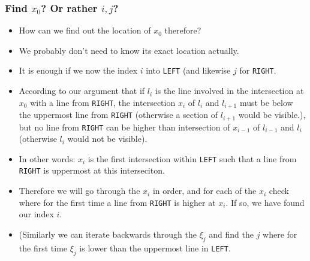 \documentclass[ignorenonframetext,]{beamer}
\begin{document}
\begin{frame}
  \frametitle{Find $x_0$? Or rather $i,j$?}
  \begin{itemize}
  \item How can we find out the location of $x_0$ therefore? 
  \item We probably don't need to know its exact location actually. 
  \item It is enough if we now the index $i$ into \texttt{LEFT} (and likewise $j$
    for \texttt{RIGHT}.
  \item According to our argument that if $l_i$ is the line involved
    in the intersection at $x_0$ with a line from \texttt{RIGHT}, the
    intersection $x_i$ of $l_i$ and $l_{i+1}$ must be below the
    uppermost line from \texttt{RIGHT} (otherwise a section of
    $l_{i+1}$ would be visible.), but no line from \texttt{RIGHT} can
    be higher than intersection of $x_{i-1}$  of $l_{i-1}$ and $l_i$
    (otherwise $l_i$ would not be visible).
  \item In other words: $x_i$ is the first intersection within
    \texttt{LEFT} such that a line from \texttt{RIGHT} is uppermost at
    this interseciton.
  \item Therefore we will go through the $x_i$ in order, and for each
    of the $x_i$ check where for the first time a line from \texttt{RIGHT} is higher at
    $x_i$. If so, we have found our index $i$.
  \item (Similarly we can iterate backwards through the $\xi_j$ and
    find the $j$ where for the first time $\xi_j$ is lower than the
    uppermost line in \texttt{LEFT}.
  \end{itemize}
\end{frame}
\end{document}
